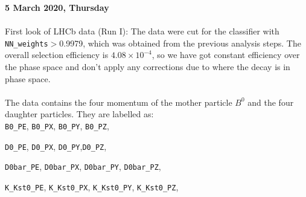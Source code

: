 \clearpage
\noindent\textbf{5 March 2020, Thursday}
\\
\\
First look of LHCb data (Run I):
The data were cut for the classifier with \texttt{NN\_weights}$>$0.9979, which was obtained from the previous analysis steps. The overall selection efficiency is $4.08\times 10^{-4}$, so we have got constant efficiency over the phase space and don't apply any corrections due to where the decay is in phase space. 
\\
\\
The data contains the four momentum of the mother particle $B^0$ and the four daughter particles. They are labelled as: 
\\

\texttt{B0\_PE}, \texttt{B0\_PX}, \texttt{B0\_PY}, \texttt{B0\_PZ}, 

\texttt{D0\_PE}, \texttt{D0\_PX}, \texttt{D0\_PY},\texttt{D0\_PZ}, 

\texttt{D0bar\_PE}, \texttt{D0bar\_PX}, \texttt{D0bar\_PY}, \texttt{D0bar\_PZ},

\texttt{K\_Kst0\_PE}, \texttt{K\_Kst0\_PX}, \texttt{K\_Kst0\_PY}, \texttt{K\_Kst0\_PZ},

